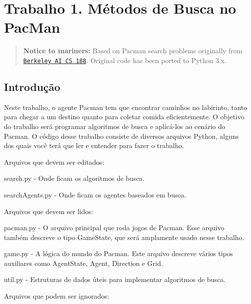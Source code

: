  \section*{Trabalho 1. Métodos de Busca no Pac\+Man}

\begin{quote}
{\bfseries Notice to mariners\+:} Based on Pacman search problems originally from \href{http://inst.eecs.berkeley.edu/~cs188/}{\tt Berkeley AI CS 188}. Original code has been ported to Python 3.\+x. \end{quote}


\subsection*{Introdução}

Neste trabalho, o agente Pacman tem que encontrar caminhos no labirinto, tanto para chegar a um destino quanto para coletar comida eficientemente. O objetivo do trabalho será programar algoritmos de busca e aplicá-\/los ao cenário do Pacman. O código desse trabalho consiste de diversos arquivos Python, alguns dos quais você terá que ler e entender para fazer o trabalho.

Arquivos que devem ser editados\+:


\begin{DoxyItemize}
\item {\ttfamily search.\+py} -\/ Onde ficam os algoritmos de busca.
\item {\ttfamily search\+Agents.\+py} -\/ Onde ficam os agentes baseados em busca.
\end{DoxyItemize}

Arquivos que devem ser lidos\+:


\begin{DoxyItemize}
\item {\ttfamily pacman.\+py} -\/ O arquivo principal que roda jogos de Pacman. Esse arquivo também descreve o tipo {\ttfamily Game\+State}, que será amplamente usado nesse trabalho.
\item {\ttfamily game.\+py} -\/ A lógica do mundo do Pacman. Este arquivo descreve vários tipos auxiliares como {\ttfamily Agent\+State}, {\ttfamily Agent}, {\ttfamily Direction} e {\ttfamily Grid}.
\item {\ttfamily util.\+py} -\/ Estruturas de dados úteis para implementar algoritmos de busca.
\end{DoxyItemize}

Arquivos que podem ser ignorados\+:


